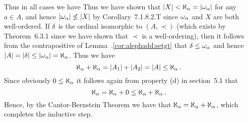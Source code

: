 \begin{solution}
    Thus in all cases we have
    Thus we have shown that $\left| X \right| < \aleph_\alpha = \left| \omega_\alpha \right|$ for any $a \in A$, and hence $\left| \omega_\alpha \right| \not\leq \left| X \right|$ by Corollary~7.1.8.2.T since $\omega_\alpha$ and $X$ are both well-ordered.
    If $\delta$ is the ordinal isomorphic to $(A, \prec)$ (which exists by Theorem~6.3.1 since we have shown that $\prec$ is a well-ordering), then it follows from the contrapositive of Lemma~\ex.\ref{cor:alephadd:setgt} that $\delta \leq \omega_\alpha$ and hence $\left| A \right| = \left| \delta \right| \leq \left| \omega_\alpha \right| = \aleph_\alpha$.
    Thus we have
    $$
    \aleph_\alpha + \aleph_\alpha = \left| A_1 \right| + \left| A_2 \right| = \left| A \right| \leq \aleph_\alpha \,.
    $$
    Since obviously $0 \leq \aleph_\alpha$ it follows again from property (d) in section~5.1 that
    $$
    \aleph_\alpha = \aleph_\alpha + 0 \leq \aleph_\alpha + \aleph_\alpha \,.
    $$
    Hence, by the Cantor-Bernstein Theorem we have that $\aleph_\alpha = \aleph_\alpha + \aleph_\alpha$, which completes the inductive step. \qedsymbol
\end{solution}


